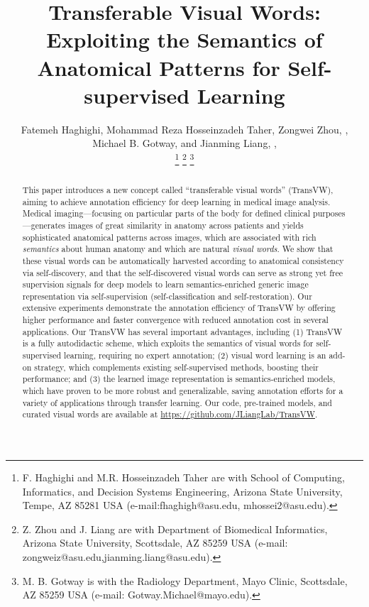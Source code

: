 \documentclass[journal,twoside,web]{ieeecolor}
\begin{document}
\title{Transferable Visual Words: \\ Exploiting the Semantics of Anatomical Patterns for Self-supervised Learning}

\author{Fatemeh Haghighi,  Mohammad Reza Hosseinzadeh Taher, Zongwei Zhou, , Michael B. Gotway, and Jianming Liang, ,

\thanks{F. Haghighi and M.R. Hosseinzadeh Taher are with  School of Computing, Informatics, and Decision Systems Engineering, Arizona State University, Tempe, AZ 85281 USA (e-mail:fhaghigh@asu.edu, mhossei2@asu.edu). }
\thanks{Z. Zhou and J. Liang are with  Department of Biomedical
Informatics, Arizona State University, Scottsdale, AZ 85259 USA (e-mail: zongweiz@asu.edu,jianming.liang@asu.edu).}
\thanks{M. B. Gotway is with the Radiology Department,
Mayo Clinic, Scottsdale, AZ 85259 USA (e-mail: Gotway.Michael@mayo.edu).}}

\maketitle

\begin{abstract}
This paper introduces a new concept called ``transferable visual words'' (TransVW), aiming to achieve annotation efficiency for deep learning in medical image analysis. Medical imaging---focusing on particular parts of the body for defined clinical purposes---generates images of great similarity in anatomy across patients and yields sophisticated anatomical patterns across images, which are associated with rich {\em semantics} about human anatomy and which are natural {\em visual words}. We show that these visual words can be automatically harvested according to anatomical consistency via self-discovery, and that the self-discovered visual words can serve as strong yet free supervision signals for deep models to learn semantics-enriched generic image representation via self-supervision (self-classification and self-restoration). 
Our extensive experiments demonstrate the annotation efficiency of TransVW by offering higher performance and faster convergence with reduced annotation cost in several applications. 
Our TransVW has several important advantages, including (1) TransVW is a fully autodidactic scheme, which exploits the semantics of visual words for self-supervised learning, requiring no expert annotation; (2) visual word learning is an add-on strategy, which complements existing self-supervised methods, boosting their performance; and (3) the learned image representation is semantics-enriched models, which have proven to be more robust and generalizable, saving annotation efforts for a variety of applications through transfer learning.
Our code, pre-trained models, and curated visual words are available at \href{https://github.com/JLiangLab/TransVW}{https://github.com/JLiangLab/TransVW}.
\end{abstract}
\end{document}

